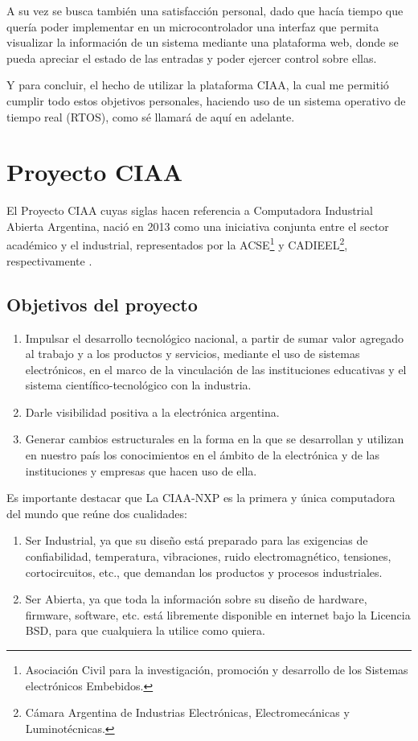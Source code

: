 A su vez se busca también una satisfacción personal, dado que hacía tiempo que quería poder implementar en un microcontrolador una interfaz que permita visualizar la información de un sistema mediante una plataforma web, donde se pueda apreciar el estado de las entradas y poder ejercer control sobre ellas.

Y para concluir, el hecho de utilizar la plataforma CIAA, la cual me permitió cumplir todo estos objetivos personales, haciendo uso de un sistema operativo de tiempo real (RTOS), como sé llamará de aquí en adelante.



\section{Proyecto CIAA}

El Proyecto CIAA cuyas siglas hacen referencia a Computadora Industrial Abierta Argentina, nació en 2013 como una iniciativa conjunta entre el sector académico y el industrial, representados por la ACSE\footnote{Asociación Civil para la investigación, promoción y desarrollo de los Sistemas electrónicos Embebidos.} y CADIEEL\footnote{Cámara Argentina de Industrias Electrónicas, Electromecánicas y Luminotécnicas.}, respectivamente \citep{CIAA}.

\subsection{Objetivos del proyecto}
\begin{enumerate}
  \item Impulsar el desarrollo tecnológico nacional, a partir de sumar valor agregado al trabajo y a los productos y servicios, mediante el uso de sistemas electrónicos, en el marco de la vinculación de las instituciones educativas y el sistema científico-tecnológico con la industria.
  \item Darle visibilidad positiva a la electrónica argentina.
  \item Generar cambios estructurales en la forma en la que se desarrollan y utilizan en nuestro país los conocimientos en el ámbito de la electrónica y de las instituciones y empresas que hacen uso de ella.
\end{enumerate}

Es importante destacar que La CIAA-NXP es la primera y única computadora del mundo que reúne dos cualidades:

\begin{enumerate}
  \item Ser Industrial, ya que su diseño está preparado para las exigencias de confiabilidad, temperatura, vibraciones, ruido electromagnético, tensiones, cortocircuitos, etc., que demandan los productos y procesos industriales.
  \item Ser Abierta, ya que toda la información sobre su diseño de hardware, firmware, software, etc. está libremente disponible en internet bajo la Licencia BSD, para que cualquiera la utilice como quiera.
\end{enumerate}

